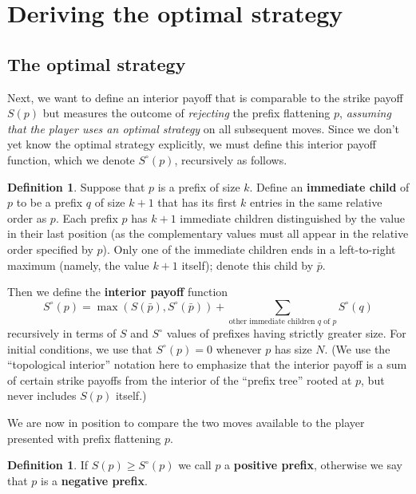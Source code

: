 \documentclass[11pt]{amsart}   %
\theoremstyle{definition}
\newtheorem{definition}[theorem]{Definition}
\theoremstyle{remark}
\numberwithin{equation}{section}
\theoremstyle{theorem}
\begin{document}
\bigskip
\section{Deriving the optimal strategy}\label{s:4}

\bigskip
\subsection{The optimal strategy}\label{s:strat}

Next, we want to define an interior payoff that is comparable to the strike payoff $S(p)$
but measures the outcome of {\em rejecting} the prefix flattening $p$, {\em
assuming that the player uses an optimal strategy} on all subsequent moves.
Since we don't yet know the optimal strategy explicitly, we must define this
interior payoff function, which we denote $S^\circ(p)$, recursively as follows.

\begin{definition}\label{d:sint}
Suppose that $p$ is a prefix of size $k$.  Define an {\bf immediate child} of
$p$ to be a prefix $q$ of size $k+1$ that has its first $k$ entries in the same
relative order as $p$.  Each prefix $p$ has $k+1$ immediate children
distinguished by the value in their last position (as the complementary values
must all appear in the relative order specified by $p$).  Only one of the
immediate children ends in a left-to-right maximum (namely, the value $k+1$
itself); denote this child by $\bar p$.  

Then we define the {\bf interior payoff} function
\[ S^\circ(p) = \max\left( S(\bar p), S^\circ(\bar p) \right) + \sum\limits_{\text{other immediate children $q$ of $p$}} S^\circ(q) \]
recursively in terms of $S$ and $S^\circ$ values of prefixes having strictly greater size.
For initial conditions, we use that $S^\circ(p) = 0$ whenever $p$ has size $N$.  (We use the ``topological interior'' notation here to emphasize that the
interior payoff is a sum of certain strike payoffs from the interior of the
``prefix tree'' rooted at $p$, but never includes $S(p)$ itself.)
\end{definition}

We are now in position to compare the two moves available to the player presented with prefix flattening $p$.
\begin{definition}\label{d:posneg}
If $S(p) \geq S^\circ(p)$ we call $p$ a {\bf positive prefix}, otherwise we say
that $p$ is a {\bf negative prefix}.
\end{definition}
\end{document}
